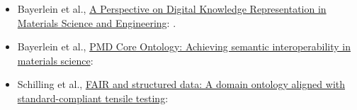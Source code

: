 \begin{itemize}
    \item Bayerlein et al., \href{https://doi.org/10.1002/adem.202101176}{A Perspective on Digital Knowledge Representation in Materials Science and Engineering}: \cite{BayerleinPerspective2022}.
    \item Bayerlein et al., \href{https://doi.org/10.1016/j.matdes.2023.112603}{PMD Core Ontology: Achieving semantic interoperability in materials science}: \cite{BayerleinPMDco2024}
    \item Schilling et al., \href{https://doi.org/10.1002/adem.202400138}{FAIR and structured data: A domain ontology aligned with standard-compliant tensile testing}: \cite{SchillingTTO2023}
\end{itemize}

\newpage
